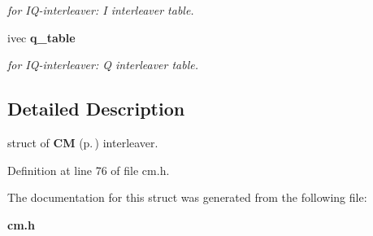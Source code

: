 \begin{CompactItemize}
\begin{CompactList}\small\item\em for IQ-interleaver: I interleaver table.\item\end{CompactList}\item 
{}
ivec {\bf q\_\-table}\label{structinterleaver__control_m4}

\begin{CompactList}\small\item\em for IQ-interleaver: Q interleaver table.\item\end{CompactList}\end{CompactItemize}


\subsection{Detailed Description}
struct of {\bf CM} {\rm (p.\,\pageref{classCM})} interleaver.



Definition at line 76 of file cm.h.

The documentation for this struct was generated from the following file:\begin{CompactItemize}
\item 
{\bf cm.h}\end{CompactItemize}
